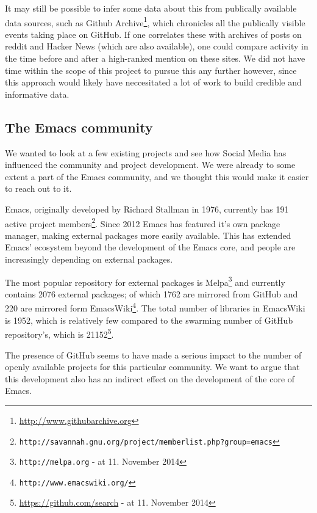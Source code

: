 \documentclass[a4paper,11pt]{article} %
\begin{document}
It may still be possible to infer some data about this from publically
available data sources, such as Github
Archive\footnote{\url{http://www.githubarchive.org}}, which chronicles all
the publically visible events taking place on GitHub. If one correlates
these with archives of posts on reddit and Hacker News (which are also
available), one could compare activity in the time before and after a
high-ranked mention on these sites. We did not have time within the scope of
this project to pursue this any further however, since this approach would
likely have neccesitated a lot of work to build credible and informative
data.

\subsection{The Emacs community}

We wanted to look at a few existing projects and see how Social Media has
influenced the community and project development. We were already to some
extent a part of the Emacs community, and we thought this would make it
easier to reach out to it.

Emacs, originally developed by Richard Stallman in 1976, currently has
\num{191} active project
members\footnote{\texttt{http://savannah.gnu.org/project/memberlist.php?group=emacs}}.
Since \num{2012} Emacs has featured it's own package manager, making
external packages more easily available. This has extended Emacs' ecosystem
beyond the development of the Emacs core, and people are increasingly
depending on external packages.

The most popular repository for external packages is
Melpa\footnote{\texttt{http://melpa.org} - at 11. November 2014} and
currently contains \num{2076} external packages; of which \num{1762} are
mirrored from GitHub and \num{220} are mirrored form
EmacsWiki\footnote{\texttt{http://www.emacswiki.org/}}. The total number of
libraries in EmacsWiki is \num{1952}, which is relatively few compared to
the swarming number of GitHub repository's, which is
\num{21152}\footnote{\href{https://github.com/search?utf8=\%E2\%9C\%93\&q=language\%3Aemacs-lisp\&type=Repositories\&ref=searchresults}{https://github.com/search} - at 11. November 2014}.

The presence of GitHub seems to have made a serious impact to the number of
openly available projects for this particular community. We want to argue
that this development also has an indirect effect on the development of the
core of Emacs.
\end{document}
